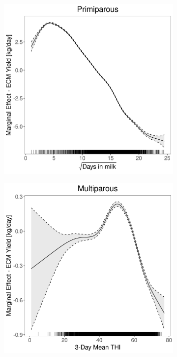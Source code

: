 \begin{figure}[H]
\begin{subfigure}[b]{0.45\textwidth}
    \end{subfigure}
    \hspace{0.05\textwidth} %
    \begin{subfigure}[b]{0.45\textwidth}
        \centering
        \includegraphics[width=\textwidth]{thesis/figures/models/ecm/after2010/sf_ecm_after2010/sf_ecm_after2010_marginal_dim_milk_primi.png}
    \end{subfigure}
    \begin{subfigure}[b]{0.45\textwidth}
        \centering
        \includegraphics[width=\textwidth]{thesis/figures/models/ecm/after2010/sf_ecm_after2010/sf_ecm_after2010_marginal_thi_milk_multi.png}

\end{subfigure}
\end{figure}
